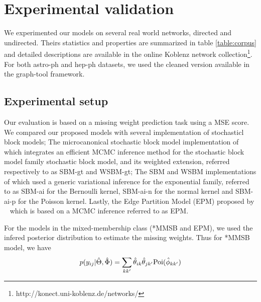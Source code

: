 \section{Experimental validation}
\label{sec:exps}

We experimented our models on several real world networks, directed and undirected. Theirs statistics and properties are summarized in table \ref{table:corpus} and detailed descriptions are available in the online Koblenz network collection\footnote{http://konect.uni-koblenz.de/networks/}. For both astro-ph and hep-ph datasets, we used the cleaned version available in the  graph-tool framework.

\begin{table*}[t]
\bgroup
\def\arraystretch{1} %
	
\egroup
\label{table:corpus}
\end{table*}

\subsection{Experimental setup}

Our evaluation is based on a missing weight prediction task using a MSE score. We compared our proposed models with several implementation of stochasticl block models; The microcanonical stochastic block model implementation of \cite{peixoto2018nonparametric} which integrates an efficient MCMC inference method for the stochastic block model family stochastic block model, and its weighted extension, referred respectively to as SBM-gt and WSBM-gt; The SBM and WSBM implementations of \cite{aicher2014learning} which used a generic variational inference for the exponential family, referred to as SBM-ai for the Bernoulli kernel, SBM-ai-n for the normal kernel and SBM-ai-p for the Poisson kernel. Lastly, the Edge Partition Model (EPM) proposed by ~\cite{zhou2015infinite} which is based on a MCMC inference referred to as EPM.

For the models in the mixed-membership class (*MMSB and EPM), we used the infered posterior distribution to estimate the missing weights. Thus for *MMSB model, we have
\[
p(y_{ij} | \hat\Theta, \hat\Phi) = \sum_{kk'} \hat\theta_{ik} \hat\theta_{jk'} \textnormal{Poi}(\hat\phi_{kk'})
\]

